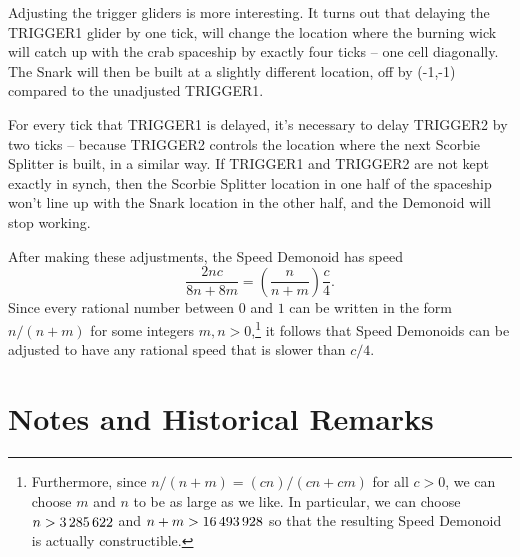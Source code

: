 Adjusting the trigger gliders is more interesting. It turns out that delaying the TRIGGER1 glider by one tick, will change the location where the burning wick will catch up with the crab spaceship by exactly four ticks -- one cell diagonally. The Snark will then be built at a slightly different location, off by (-1,-1) compared to the unadjusted TRIGGER1.

For every tick that TRIGGER1 is delayed, it's necessary to delay TRIGGER2 by two ticks -- because TRIGGER2 controls the location where the next Scorbie Splitter is built, in a similar way. If TRIGGER1 and TRIGGER2 are not kept exactly in synch, then the Scorbie Splitter location in one half of the spaceship won't line up with the Snark location in the other half, and the Demonoid will stop working.

After making these adjustments, the Speed Demonoid has speed
\[
	\frac{2nc}{8n + 8m} = \left(\frac{n}{n+m}\right)\frac{c}{4}.
\]
Since every rational number between $0$ and $1$ can be written in the form $n/(n+m)$ for some integers $m,n > 0$,\footnote{Furthermore, since $n/(n+m) = (cn)/(cn+cm)$ for all $c > 0$, we can choose $m$ and $n$ to be as large as we like. In particular, we can choose $n > 3{\,}285{\,}622$ and $n+m > 16{\,}493{\,}928$ so that the resulting Speed Demonoid is actually constructible.} it follows that Speed Demonoids can be adjusted to have any rational speed that is slower than $c/4$.




\section{Notes and Historical Remarks}\label{sec:universal_construction_history}



